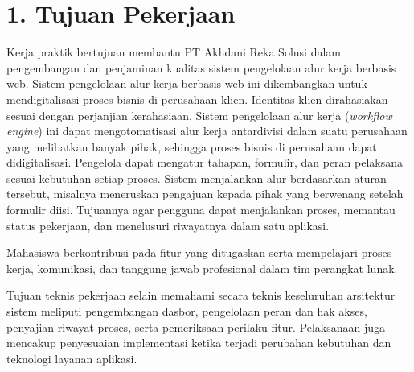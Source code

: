 \section*{1. Tujuan Pekerjaan}
Kerja praktik bertujuan membantu PT Akhdani Reka Solusi dalam pengembangan dan penjaminan kualitas sistem pengelolaan alur kerja berbasis web. Sistem pengelolaan alur kerja berbasis web ini dikembangkan untuk mendigitalisasi proses bisnis di perusahaan klien. Identitas klien dirahasiakan sesuai dengan perjanjian kerahasiaan. Sistem pengelolaan alur kerja (\textit{workflow engine}) ini dapat mengotomatisasi alur kerja antardivisi dalam suatu perusahaan yang melibatkan banyak pihak, sehingga proses bisnis di perusahaan dapat didigitalisasi. Pengelola dapat mengatur tahapan, formulir, dan peran pelaksana sesuai kebutuhan setiap proses. Sistem menjalankan alur berdasarkan aturan tersebut, misalnya meneruskan pengajuan kepada pihak yang berwenang setelah formulir diisi. Tujuannya agar pengguna dapat menjalankan proses, memantau status pekerjaan, dan menelusuri riwayatnya dalam satu aplikasi.

Mahasiswa berkontribusi pada fitur yang ditugaskan serta mempelajari proses kerja, komunikasi, dan tanggung jawab profesional dalam tim perangkat lunak.

Tujuan teknis pekerjaan selain memahami secara teknis keseluruhan arsitektur sistem meliputi pengembangan dasbor, pengelolaan peran dan hak akses, penyajian riwayat proses, serta pemeriksaan perilaku fitur. Pelaksanaan juga mencakup penyesuaian implementasi ketika terjadi perubahan kebutuhan dan teknologi layanan aplikasi.

